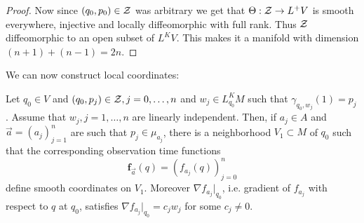 \begin{proof}
    Now since $(q_0,p_0)\in {\mathcal{Z}}$ was arbitrary we get that $\Theta:{\mathcal{Z}}\to L^+V$ is smooth everywhere, injective and locally diffeomorphic with full rank. Thus ${\mathcal{Z}}$ diffeomorphic to an open subset of $L^KV$. This makes it a manifold with dimension $(n+1)+(n-1)=2n$.
\end{proof}

We can now construct local coordinates:
\begin{proposition}\label{prop:observationtimecoordinates}
Let $q_0\in V$ and $(q_0,p_j)\in {\mathcal{Z}}, j=0,\dots, n$ and $w_j\in L^K_{q_0}M$ such that $\gamma_{q_0,w_j}(1) = p_j$. Assume that $w_j, j=1,\dots, n$ are linearly independent. Then, if $a_j\in A$ and $\overrightarrow{a} = (a_j)^n_{j=1}$ are such that $p_j\in \mu_{a_j}$, there is a neighborhood $V_1\subset M$ of $q_0$ such that the corresponding observation time functions 
\[
\mathbf{f}_{\overrightarrow{a}}(q) = (f_{a_j}(q))^n_{j=0}
\]
define smooth coordinates on $V_1$. Moreover $\nabla f_{a_j}\rvert_{q_0}$, i.e. gradient of $f_{a_j}$ with respect to $q$ at $q_0$, satisfies $\nabla f_{a_j}\rvert_{q_0} = c_jw_j$ for some $c_j\neq 0$.
\end{proposition}


